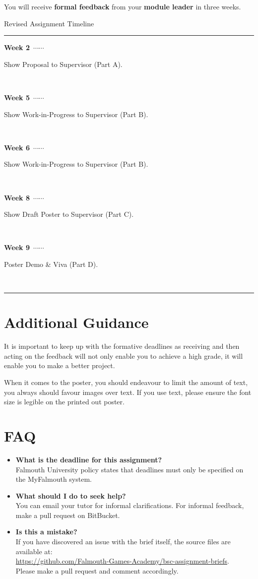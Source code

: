 \documentclass{../../fal_assignment}
\newcommand\ytl[2]{
\parbox[b]{8em}{\hfill{\color{black}\bfseries\sffamily #1}~$\cdots\cdots$~}\makebox[0pt][c]{$\bullet$}\vrule\quad \parbox[c]{4.5cm}{\vspace{7pt}\color{black}\raggedright\sffamily #2.\\[7pt]}\\[-3pt]}
\begin{document}
You will receive \textbf{formal feedback} from your \textbf{module leader} in three weeks.

\begin{table}[!ht]
\caption{Revised Assignment Timeline}
\centering
\begin{minipage}[t]{.7\linewidth}
\color{black}
\rule{\linewidth}{1pt}
\ytl{Week 2}{Show Proposal to Supervisor (Part A)}
\ytl{Week 5}{Show Work-in-Progress to Supervisor (Part B)}
\ytl{Week 6}{Show Work-in-Progress to Supervisor (Part B)}
\ytl{Week 8}{Show Draft Poster to Supervisor (Part C)}
\ytl{Week 9}{Poster Demo \& Viva (Part D)}
\bigskip
\rule{\linewidth}{1pt}%
\end{minipage}%
\end{table}

\section*{Additional Guidance}

It is important to keep up with the formative deadlines as receiving and then
acting on the feedback will not only enable you to achieve a high grade, it
will enable you to make a better project.

When it comes to the poster, you should endeavour to limit the amount of text,
you always should favour images over text. If you use text, please ensure the
font size is legible on the printed out poster.

\section*{FAQ}

\begin{itemize}
	\item 	\textbf{What is the deadline for this assignment?} \\ 
    		Falmouth University policy states that deadlines must only be specified on the MyFalmouth system.
    		
	\item 	\textbf{What should I do to seek help?} \\ 
    		You can email your tutor for informal clarifications. For informal feedback, make a pull request on BitBucket. 
    		
    	\item 	\textbf{Is this a mistake?} \\ 	
    		If you have discovered an issue with the brief itself, the source files are available at: \\
    		\url{https://github.com/Falmouth-Games-Academy/bsc-assignment-briefs}.\\
    		 Please make a pull request and comment accordingly.
\end{itemize}
\end{document}
